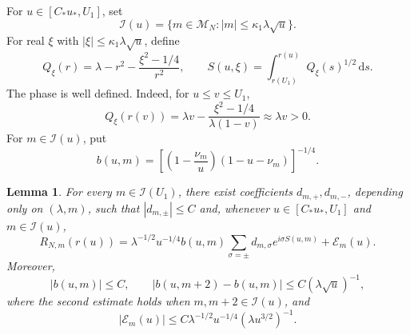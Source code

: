 \documentclass[10pt,a4paper]{amsart}
\newtheorem{lemma}[theorem]{Lemma}
\numberwithin{equation}{section}
\newcommand{\dd}{\,\mathrm d}
\begin{document}
For \(u\in[C_*u_*,U_1]\), set
\[
 \mathcal I(u)=\{m\in\mathcal M_N:|m|\le\kappa_1\lambda\sqrt u\}.
\]
For real \(\xi\) with \(|\xi|\le\kappa_1\lambda\sqrt u\), define
\[
 Q_\xi(r)=\lambda-r^2-\frac{\xi^2-1/4}{r^2},
 \qquad
 S(u,\xi)=\int_{r(U_1)}^{r(u)}Q_\xi(s)^{1/2}\dd s.
\]
The phase is well defined. Indeed, for \(u\le v\le U_1\),
\[
 Q_\xi(r(v))
 =\lambda v-\frac{\xi^2-1/4}{\lambda(1-v)}
 \approx\lambda v>0.
\]
For \(m\in\mathcal I(u)\), put
\[
 b(u,m)=\left[\left(1-\frac{\nu_m}{u}\right)
                (1-u-\nu_m)\right]^{-1/4}.
\]

\begin{lemma}\label{lem:lg-radial}
For every \(m\in\mathcal I(U_1)\), there exist coefficients
\(d_{m,+},d_{m,-}\), depending only on \((\lambda,m)\), such that
\(|d_{m,\pm}|\le C\) and, whenever
\(u\in[C_*u_*,U_1]\) and \(m\in\mathcal I(u)\),
\begin{equation}\label{eq:lg-expansion}
 R_{N,m}(r(u))
 =\lambda^{-1/2}u^{-1/4}b(u,m)
  \sum_{\sigma=\pm}d_{m,\sigma}e^{i\sigma S(u,m)}
  +\mathcal E_m(u).
\end{equation}
Moreover,
\begin{equation}\label{eq:lg-symbol}
 |b(u,m)|\le C,
 \qquad
 |b(u,m+2)-b(u,m)|\le C(\lambda\sqrt u)^{-1},
\end{equation}
where the second estimate holds when
\(m,m+2\in\mathcal I(u)\), and
\begin{equation}\label{eq:lg-error}
 |\mathcal E_m(u)|
 \le C\lambda^{-1/2}u^{-1/4}(\lambda u^{3/2})^{-1}.
\end{equation}
\end{lemma}
\end{document}
